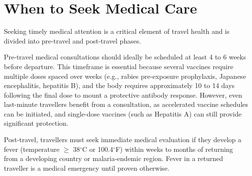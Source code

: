 \section*{When to Seek Medical Care}
Seeking timely medical attention is a critical element of travel health and is divided into pre-travel and post-travel phases.

Pre-travel medical consultations should ideally be scheduled at least 4 to 6 weeks before departure. This timeframe is essential because several vaccines require multiple doses spaced over weeks (e.g., rabies pre-exposure prophylaxis, Japanese encephalitis, hepatitis B), and the body requires approximately 10 to 14 days following the final dose to mount a protective antibody response. However, even last-minute travellers benefit from a consultation, as accelerated vaccine schedules can be initiated, and single-dose vaccines (such as Hepatitis A) can still provide significant protection.

Post-travel, travellers must seek immediate medical evaluation if they develop a fever (temperature $\ge$ 38$^\circ$C or 100.4$^\circ$F) within weeks to months of returning from a developing country or malaria-endemic region. Fever in a returned traveller is a medical emergency until proven otherwise.

